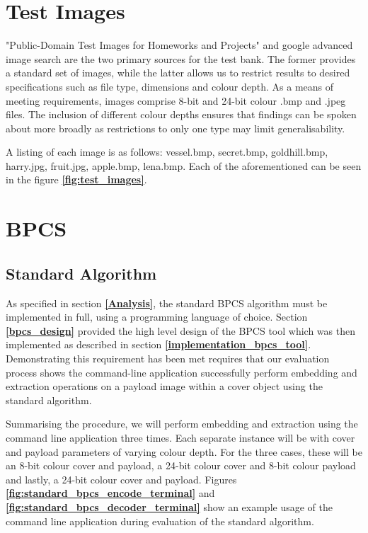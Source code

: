 \documentclass{l4proj}
\begin{document}
\section{Test Images}

"Public-Domain Test Images for Homeworks and Projects" \citep{testimages} and google advanced image search are the two primary sources for the test bank. The former provides a standard set of images, while the latter allows us to restrict results to desired specifications such as file type, dimensions and colour depth. As a means of meeting requirements, images comprise 8-bit and 24-bit colour .bmp and .jpeg files. The inclusion of different colour depths ensures that findings can be spoken about more broadly as restrictions to only one type may limit generalisability. 

A listing of each image is as follows: vessel.bmp, secret.bmp, goldhill.bmp, harry.jpg, fruit.jpg, apple.bmp, lena.bmp. Each of the aforementioned can be seen in the figure \textbf{\ref{fig:test_images}}.


\section{BPCS}

\subsection{Standard Algorithm}\label{evaluation_standard_algorithm}

As specified in section \textbf{\ref{Analysis}}, the standard BPCS algorithm must be implemented in full, using a programming language of choice. Section \textbf{\ref{bpcs_design}} provided the high level design of the BPCS tool which was then implemented as described in section \textbf{\ref{implementation_bpcs_tool}}. Demonstrating this requirement has been met requires that our evaluation process shows the command-line application successfully perform embedding and extraction operations on a payload image within a cover object using the standard algorithm. 

Summarising the procedure, we will perform embedding and extraction using the command line application three times. Each separate instance will be with cover and payload parameters of varying colour depth. For the three cases, these will be an 8-bit colour cover and payload, a 24-bit colour cover and 8-bit colour payload and lastly, a 24-bit colour cover and payload. Figures \textbf{\ref{fig:standard_bpcs_encode_terminal}} and \textbf{\ref{fig:standard_bpcs_decoder_terminal}} show an example usage of the command line application during evaluation of the standard algorithm.
\end{document}
